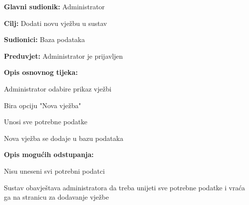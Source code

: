 					\noindent {}
					\begin{packed_item}
						
						\item \textbf{Glavni sudionik:} Administrator
						\item  \textbf{Cilj:} Dodati novu vježbu u sustav
						\item  \textbf{Sudionici:} Baza podataka
						\item  \textbf{Preduvjet:} Administrator je prijavljen
						\item  \textbf{Opis osnovnog tijeka:}
						
						\item[] \begin{packed_enum}
							
							\item Administrator odabire prikaz vježbi
							\item Bira opciju "Nova vježba"
							\item Unosi sve potrebne podatke
							\item Nova vježba se dodaje u bazu podataka
							
						\end{packed_enum}
						
						\item  \textbf{Opis mogućih odstupanja:}
						
						\item[] \begin{packed_item}
							
							\item[3.a] Nisu uneseni svi potrebni podatci
							\item[] \begin{packed_enum}
								
								\item Sustav obavještava administratora da treba unijeti sve potrebne podatke i vraća ga na stranicu za dodavanje vježbe
							\end{packed_enum}
							
						\end{packed_item}	
						
					\end{packed_item}
					
